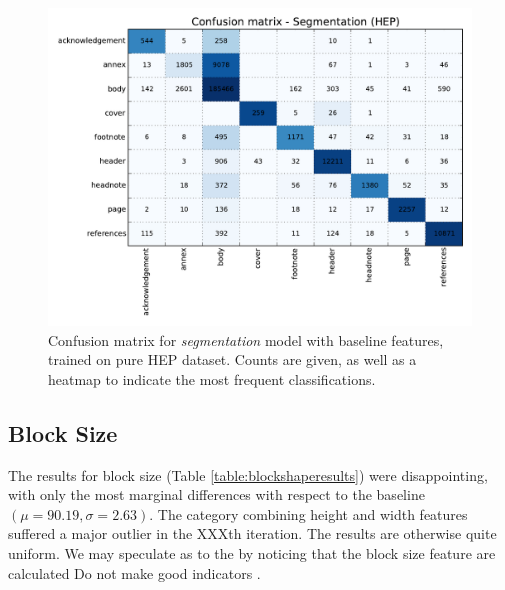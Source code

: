 \begin{figure}[h]
\center
\includegraphics[width=5.5in]{Figures/baseline_confusion_segmentation.pdf}
\caption{Confusion matrix for \emph{segmentation} model with baseline features, trained on pure HEP dataset. Counts are given, as well as a heatmap to indicate the most frequent classifications.}
\label{fig:segmentation_baseline_confusion}
\end{figure}


\subsection{Block Size}

The results for block size (Table \ref{table:blockshaperesults}) were disappointing, with only the most marginal differences with respect to the baseline $(\mu = 90.19, \sigma = 2.63)$. The category combining height and width features suffered a major outlier in the XXXth iteration. The results are otherwise quite uniform. We may speculate as to the by noticing that the block size feature are calculated  Do not make good indicators .

